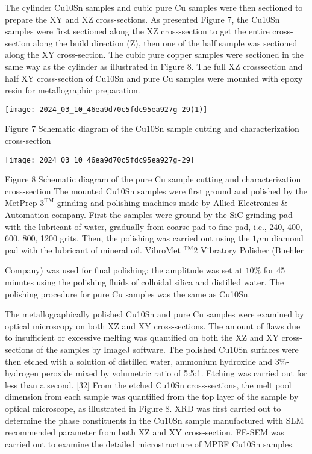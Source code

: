 \documentclass[10pt]{article}
\begin{document}
The cylinder Cu10Sn samples and cubic pure Cu samples were then sectioned to prepare the XY and XZ cross-sections. As presented Figure 7, the Cu10Sn samples were first sectioned along the XZ cross-section to get the entire cross-section along the build direction (Z), then one of the half sample was sectioned along the XY cross-section. The cubic pure copper samples were sectioned in the same way as the cylinder as illustrated in Figure 8. The full XZ crosssection and half XY cross-section of Cu10Sn and pure Cu samples were mounted with epoxy resin for metallographic preparation.

\begin{center}
\texttt{[image: 2024\_03\_10\_46ea9d70c5fdc95ea927g-29(1)]}
\end{center}

Figure 7 Schematic diagram of the Cu10Sn sample cutting and characterization cross-section

\begin{center}
\texttt{[image: 2024\_03\_10\_46ea9d70c5fdc95ea927g-29]}
\end{center}

Figure 8 Schematic diagram of the pure Cu sample cutting and characterization cross-section The mounted Cu10Sn samples were first ground and polished by the MetPrep $3^{\mathrm{TM}}$ grinding and polishing machines made by Allied Electronics \& Automation company. First the samples were ground by the SiC grinding pad with the lubricant of water, gradually from coarse pad to fine pad, i.e., 240, 400, 600, 800, 1200 grits. Then, the polishing was carried out using the $1 \mu \mathrm{m}$ diamond pad with the lubricant of mineral oil. VibroMet ${ }^{\mathrm{TM}} 2$ Vibratory Polisher (Buehler

Company) was used for final polishing: the amplitude was set at $10 \%$ for 45 minutes using the polishing fluids of colloidal silica and distilled water. The polishing procedure for pure $\mathrm{Cu}$ samples was the same as Cu10Sn.

The metallographically polished Cu10Sn and pure Cu samples were examined by optical microscopy on both XZ and XY cross-sections. The amount of flaws due to insufficient or excessive melting was quantified on both the XZ and XY cross-sections of the samples by ImageJ software. The polished Cu10Sn surfaces were then etched with a solution of distilled water, ammonium hydroxide and 3\%-hydrogen peroxide mixed by volumetric ratio of 5:5:1. Etching was carried out for less than a second. [32] From the etched Cu10Sn cross-sections, the melt pool dimension from each sample was quantified from the top layer of the sample by optical microscope, as illustrated in Figure 8. XRD was first carried out to determine the phase constituents in the Cu10Sn sample manufactured with SLM recommended parameter from both XZ and XY cross-section. FE-SEM was carried out to examine the detailed microstructure of MPBF Cu10Sn samples.
\end{document}
